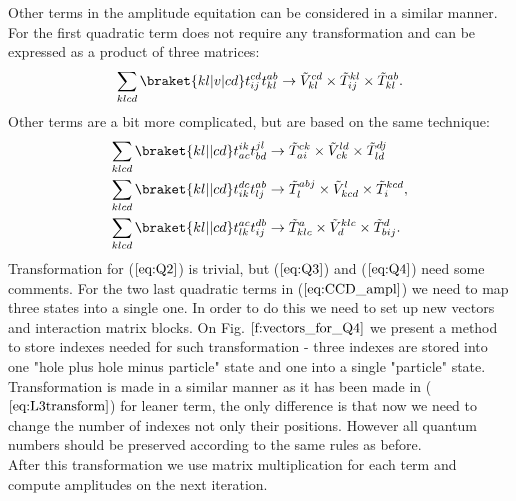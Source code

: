 Other terms in the amplitude equitation can be considered in a similar manner. For the first quadratic term does not require any transformation and can be expressed as a product of three matrices:
\begin{equation}
\sum_{klcd}\braket{kl|v|cd}t_{ij}^{cd} t_{kl}^{ab} \rightarrow \tilde{V}_{kl}^{cd} \times \tilde{T}_{ij}^{kl} \times \tilde{T}_{kl}^{ab }. 
\end{equation}
Other terms are a bit more complicated, but are based on the same technique:
\begin{align}
\sum_{klcd}\braket{kl||cd}t_{ac}^{ik} t_{bd}^{jl}   &\rightarrow  \tilde{T}_{ai}^{ck}\times\tilde{V}_{ck}^{ld}\times\tilde{T}_{ld}^{dj} \label{eq:Q2} \\ 
\sum_{klcd}\braket{kl||cd}t_{ik}^{dc}t_{lj}^{ab} &\rightarrow     \tilde{T}_{l}^{abj}\times \tilde{V}_{kcd}^{l} \times  \tilde{T}_{i}^{kcd}, \label{eq:Q3} \\ 
\sum_{klcd}\braket{kl||cd}t_{lk}^{ac}t_{ij}^{db} &\rightarrow \tilde{T}_{klc}^{a} \times  \tilde{V}_{d}^{klc}\times \tilde{T}_{bij}^{d}. \label{eq:Q4}
\end{align}
Transformation for ($\ref{eq:Q2}$) is trivial, but ($\ref{eq:Q3}$) and ($\ref{eq:Q4}$) need some comments. For the two last quadratic terms in ($\ref{eq:CCD_ampl}$) we need to map three states into a single one. In order to do this we need to set up new vectors and interaction matrix blocks. On Fig. $\ref{f:vectors_for_Q4}$ we present a method to store indexes needed for such transformation - three indexes are stored into one "hole plus hole minus particle" state and one into a single "particle" state. Transformation is made in a similar manner as it has been made in  ($\ref{eq:L3transform}$) for leaner term, the only difference is that now we need to change the number of indexes not only their positions. However all quantum numbers should be preserved according to the same rules as before.\\
After this transformation we use matrix multiplication for each term and compute amplitudes on the next iteration. 

